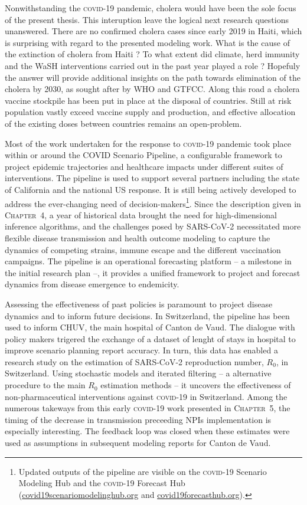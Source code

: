 Nonwithstanding the \textsc{covid}-19 pandemic, cholera would have been the sole focus of the present thesis. This interuption leave the logical next research questions unanswered. There are no confirmed cholera cases since early 2019 in Haiti, which is surprising with regard to the presented modeling work. What is the cause of the extinction of cholera from Haiti ? To what extent did climate, herd immunity and the WaSH interventions carried out in the past year played a role ? Hopefuly the answer will provide additional insights on the path towards elimination of the cholera by 2030, as sought after by WHO and GTFCC. Along this road a cholera vaccine stockpile has been put in place at the disposal of countries. Still at risk population vastly exceed vaccine supply and production\cite{Pezzoli:GlobalOralCholera:2019}, and effective allocation of the existing doses between countries remains an open-problem.

Most of the work undertaken for the response to \textsc{covid}-19 pandemic took place within or around the COVID Scenario Pipeline, a configurable framework to project epidemic trajectories and healthcare impacts under different suites of interventions. The pipeline is used to support several partners including the state of California and the national US response. It is still being actively developed to address the ever-changing need of decision-makers\footnote{Updated outputs of the pipeline are visible on the \textsc{covid}-19 Scenario Modeling Hub and the \textsc{covid}-19 Forecast Hub (\url{covid19scenariomodelinghub.org} and \url{covid19forecasthub.org}).}. Since the description given in \textsc{Chapter~4}, a year of historical data brought the need for high-dimensional inference algorithms, and the challenges posed by SARS-CoV-2 necessitated more flexible disease transmission and health outcome modeling to capture the dynamics of competing strains, immune escape and the different vaccination campaigns. The pipeline is an operational forecasting platform -- a milestone in the initial research plan --, it provides a unified framework to project and forecast dynamics from disease emergence to endemicity.

Assessing the effectiveness of past policies is paramount to project disease dynamics and to inform future decisions. In Switzerland, the pipeline has been used to inform CHUV, the main hospital of Canton de Vaud. The dialogue with policy makers trigered the exchange of a dataset of lenght of stays in hospital to improve scenario planning report accuracy. In turn, this data has enabled a research study on the estimation of SARS-CoV-2 reproduction number, $R_0$, in Switzerland. Using stochastic models and iterated filtering -- a alternative procedure to the main $R_0$ estimation methods -- it uncovers the effectiveness of non-pharmaceutical interventions against \textsc{covid-19} in Switzerland. Among the numerous takeways from this early \textsc{covid}-19 work presented in \textsc{Chapter~5}, the timing of the decrease in transmission preceeding NPIs implementation is especially interesting. The feedback loop was closed when these estimates were used as assumptions in subsequent modeling reports for Canton de Vaud.

